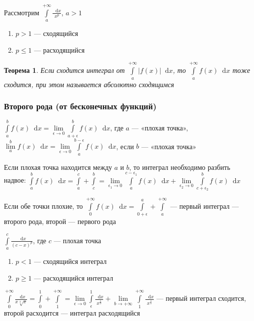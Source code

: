 \documentclass{article}
\newcommand*\diff{\mathop{}\!\mathrm{d}}
\newtheorem{theorem}{Теорема}
\begin{document}
\hfill

Рассмотрим $\int\limits_{a}^{+\infty} \frac{\diff x}{x^p}$, $a > 1$

\begin{enumerate}
    \item $p > 1$ — сходящийся
    \item $p \le 1$ — расходящийся
\end{enumerate}

\begin{theorem}
    Если сходится интеграл от $\int\limits_{a}^{+\infty} |f(x)| \diff x$, то $\int\limits_{a}^{+\infty} f(x) \diff x$ тоже сходится, при этом называется абсолютно сходящимся
\end{theorem}

\subsubsection{Второго рода (от бесконечных функций)}

$\int\limits_{a}^{b} f(x) \diff x = \lim\limits_{\epsilon \to 0} \int\limits_{a + \epsilon}^{b} f(x) \diff x$, где $a$ — «плохая точка», $\lim\limits_{a}^{b} f(x) \diff x = \lim\limits_{\epsilon \to 0} \int\limits_{a}^{b - \epsilon} f(x) \diff x$, если $b$ — «плохая точка»

Если плохая точка находится между $a$ и $b$, то интеграл необходимо разбить надвое: $\int\limits_{a}^{b} f(x) \diff x = \int\limits_{a}^{c} + \int\limits_{c}^{b} = \lim\limits_{\epsilon_1 \to 0} \int\limits_{a}^{c - \epsilon_1} f(x) \diff x + \lim\limits_{\epsilon_2 \to 0} \int\limits_{c + \epsilon_2}^{b} f(x) \diff x$

\hfill

Если обе точки плохие, то $\int\limits_{0}^{+\infty} f(x) \diff x = \int\limits_{0 + \epsilon}^{a} + \int\limits_{a}^{+\infty}$ — первый интеграл — второго рода, второй — первого рода

\hfill

\hfill

$\int\limits_{a}^{c} \frac{\diff x}{(c - x)^{p}}$, где $c$ — плохая точка

\begin{enumerate}
    \item $p < 1$ — сходящийся интеграл
    \item $p \ge 1$ — расходящийся интеграл
\end{enumerate}

\hfill

$\int\limits_{0}^{+\infty} \frac{\diff x}{x \sqrt[3]{x}} = \int\limits_{0}^{1} + \int\limits_{1}^{+\infty} = \lim\limits_{\epsilon \to 0} \int\limits_{\epsilon}^{1} \frac{\diff x}{x^{\frac{4}{3}}} + \lim\limits_{b \to +\infty} \int\limits_{1}^{+\infty} \frac{\diff x}{x^{\frac{4}{3}}}$ — первый интеграл сходится, второй расходится — интеграл расходящийся
\end{document}
